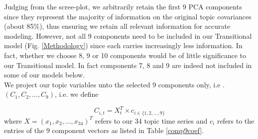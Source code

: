 \documentclass[10pt]{article}
\begin{document}
	Judging from the scree-plot, we arbitrarily retain the first 9 PCA components since they represent the majority of information on the original topic covariances (about 85\%), thus ensuring we retain all relevant information for accurate modeling. However, not all 9 components need to be included in our Transitional model (Fig. \ref{Methodology}) since each carries increasingly less information. In fact, whether we choose 8, 9 or 10 components would be of little significance to our Transitional model. In fact components 7, 8 and 9 are indeed not included in some of our models below.\\
	
	We project our topic variables unto the selected 9 components only, i.e .$(C_1, C_2,...,C_9)$, i.e. we define 
	
	\[ C_{i, t}=X^T_t \times c_{i \in \{1,2,...,9\}}\]
	where $X=(x_1,x_2, ... ,x_{34})^T$ refers to our 34 topic time series and $c_i$ refers to the entries of the 9 component vectors as listed in Table \ref{comp9coef}.\\
\end{document}
